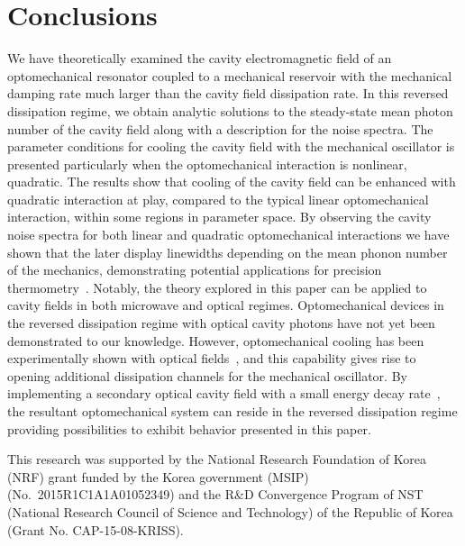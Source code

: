 \documentclass[pra,aps,showpacs,twocolumn,floatfix, superscriptaddress, nofootinbib, nobibnotes]{revtex4-1}
\begin{document}
\section{Conclusions}
\label{Sec:Conclusions}
We have theoretically examined the cavity electromagnetic field of an optomechanical resonator coupled to a mechanical reservoir with the mechanical damping rate much larger than the cavity field dissipation rate. In this reversed dissipation regime, we obtain analytic solutions to the steady-state mean photon number of the cavity field along with a description for the noise spectra. The parameter conditions for cooling the cavity field with the mechanical oscillator is presented particularly when the optomechanical interaction is nonlinear, quadratic. The results show that cooling of the cavity field can be enhanced with quadratic interaction at play, compared to the typical linear optomechanical interaction, within some regions in parameter space. By observing the cavity noise spectra for both linear and quadratic optomechanical interactions we have shown that the later display linewidths depending on the mean phonon number of the mechanics, demonstrating potential applications for precision thermometry~\cite{PhysRevA.93.013836}.  Notably, the theory explored in this paper can be applied to cavity fields in both microwave and optical regimes. Optomechanical devices in the reversed dissipation regime with optical cavity photons have not yet been demonstrated to our knowledge. However, optomechanical cooling has been experimentally shown with optical fields~\cite{Chan:2011aa}, and this capability gives rise to opening additional dissipation channels for the mechanical oscillator. By implementing a secondary optical cavity field with a small energy decay rate~\cite{PhysRevLett.113.023604}, the resultant optomechanical system can reside in the reversed dissipation regime providing possibilities to exhibit behavior presented in this paper.

\acknowledgments
This research was supported by the National Research Foundation of Korea (NRF) grant funded by the Korea government (MSIP) (No.~2015R1C1A1A01052349) and the R\&D Convergence Program of NST (National Research Council of Science and Technology) of the Republic of Korea (Grant No. CAP-15-08-KRISS). 

\appendix


\end{document}
